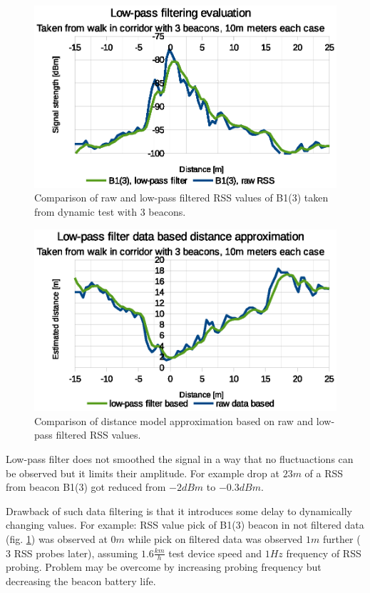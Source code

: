 \documentclass[../main.tex]{subfiles}
\begin{document}
\begin{figure}[!htbp]
\includegraphics[width=\textwidth,clip]{pictures/tests_case10_b1_3_low_pass}
\caption{Comparison of raw and low-pass filtered RSS values of B1(3) taken from dynamic test with 3 beacons.}
\label{fig:tests_case10_b1_3_low_pass}
\end{figure}
\begin{figure}[!htbp]
\includegraphics[width=\textwidth,clip]{pictures/tests_case10_b1_3_low_pass_dist_model}
\caption{Comparison of distance model approximation based on raw and low-pass filtered RSS values.}
\label{fig:tests_case10_b1_3_low_pass_dist_model}
\end{figure}


Low-pass filter does not smoothed the signal in a way that no fluctuactions can be observed but it limits their amplitude. For example drop at $23m$ of a RSS from beacon B1(3) got reduced from $-2dBm$ to $-0.3dBm$.

Drawback of such data filtering is that it introduces some delay to dynamically changing values. For example: RSS value pick of B1(3) beacon in not filtered data (fig. \ref{fig:tests_case10_b1_3_low_pass}) was observed at $0m$ while pick on filtered data was observed $1m$ further ($3$ RSS probes later), assuming $1.6\frac{km}{h}$ test device speed and $1Hz$ frequency of RSS probing. Problem may be overcome by increasing probing frequency but decreasing the beacon battery life.
\end{document}
